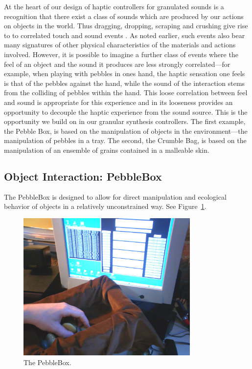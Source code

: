 At the heart of our design of haptic controllers for granulated sounds is a recognition that there exist a class of sounds which are produced by our actions on objects in the world.  Thus dragging, dropping, scraping and crushing give rise to to correlated touch and sound events \cite{:2003b}.  As noted earlier, such events also bear many signatures of other physical characteristics  of the materials and actions involved.  However, it is possible to imagine a further class of events where the feel of an object and the sound it produces are less strongly correlated---for example, when playing with pebbles in ones hand, the haptic sensation one feels is that of the pebbles against the hand, while the sound of the interaction stems from the colliding of pebbles within the hand.  This loose correlation between feel and sound is appropriate for this experience and in its looseness provides an opportunity to decouple the haptic experience from the sound source.  This is the opportunity we build on in our granular synthesis controllers.  The first example, the Pebble Box, is based on the manipulation of objects in the environment---the manipulation of pebbles in a tray.  The second, the Crumble Bag, is based on the manipulation of an ensemble of grains contained in a malleable skin.

\subsection{Object Interaction: PebbleBox}

The PebbleBox is designed to allow for direct manipulation and 
ecological behavior of objects in a relatively unconstrained way. See Figure~\ref{Omodhrain:fig:pebblebox}.

\begin{figure}[t]
\centering
\includegraphics[width=90mm]{pebblebox-new-cropped2-eps-converted-to.pdf}
\caption{The PebbleBox.}
\label{Omodhrain:fig:pebblebox}
\end{figure}

